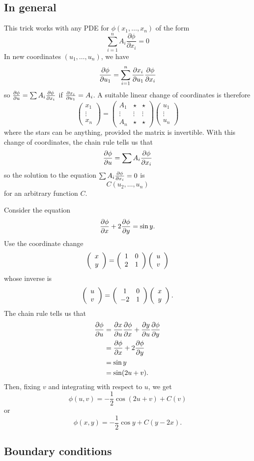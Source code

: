 \subsection{In general}
This trick works with any PDE for $\phi(x_1,\ldots,x_n)$ of the form
\[\sum_{i=1}^nA_i\frac{\partial\phi}{\partial x_i}=0\]
In new coordinates $(u_1,\ldots,u_n)$, we have
\[\frac{\partial \phi}{\partial u_1}=\sum_{i=1}^n\frac{\partial x_i}{\partial u_1}\frac{\partial \phi}{\partial x_i}\]
so $\frac{\partial \phi}{\partial u}=\sum A_i\frac{\partial \phi}{\partial x_i}$ if $\frac{\partial x_i}{\partial u_1}=A_i$. A suitable linear change of coordinates is therefore
\[\left(\begin{array}{c}
x_1\\
\vdots\\
x_n
\end{array}\right)=\left(\begin{array}{ccc}A_1 & \star & \star\\
\vdots & \vdots & \vdots\\
A_n & \star & \star\end{array}\right)\left(\begin{array}{c}u_1\\ \vdots\\ u_n\end{array}\right)\]
where the stars can be anything, provided the matrix is invertible. With this change of coordinates, the chain rule tells us that
\[\frac{\partial \phi}{\partial u}=\sum A_i\frac{\partial \phi}{\partial x_i}\]
so the solution to the equation $\sum A_i\frac{\partial \phi}{\partial x_i}=0$ is
\[C(u_2,\ldots,u_n)\]
for an arbitrary function $C$.

\begin{exm}
Consider the equation
\[\frac{\partial \phi}{\partial x}+2\frac{\partial \phi}{\partial y}=\sin y.\]
Use the coordinate change
\[\left(\begin{array}{c}x\\y\end{array}\right)=\left(\begin{array}{cc}1&0\\2&1\end{array}\right)\left(\begin{array}{c}u\\v\end{array}\right)\]
whose inverse is
\[\left(\begin{array}{c}u\\v\end{array}\right)=\left(\begin{array}{cc}1&0\\-2&1\end{array}\right)\left(\begin{array}{c}x\\y\end{array}\right).\]
The chain rule tells us that
\begin{align*}
\frac{\partial \phi}{\partial u}&=\frac{\partial x}{\partial u}\frac{\partial \phi}{\partial x}+\frac{\partial y}{\partial u}\frac{\partial \phi}{\partial y}\\
            &=\frac{\partial \phi}{\partial x}+2\frac{\partial \phi}{\partial y}\\
            &=\sin y\\
            &=\sin(2u+v).
\end{align*}
Then, fixing $v$ and integrating with respect to $u$, we get
\[\phi(u,v)=-\frac{1}{2}\cos(2u+v)+C(v)\]
or
\[\phi(x,y)=-\frac{1}{2}\cos y+C(y-2x).\]
\end{exm}

\subsection{Boundary conditions}

